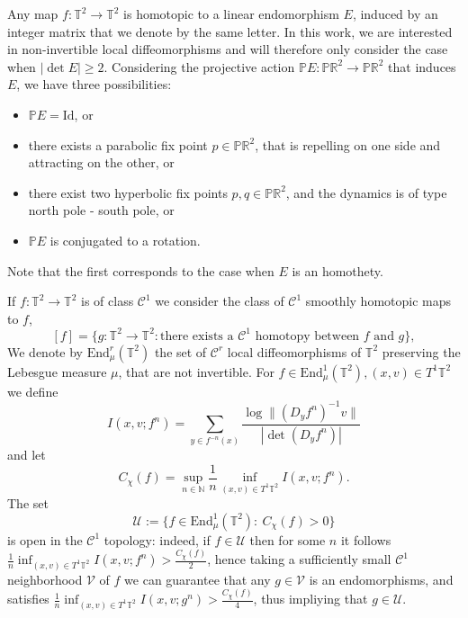 \documentclass[11pt,letterpaper,reqno]{article}
\newcommand{\Tor}{\mathbb{T}^2}
\newcommand{\Pp}{\mathbb P}
\newcommand{\TT}{\mathbb{T}^2}
\newcommand{\RR}{\mathbb{R}^2}
\begin{document}
Any map $f:\Tor\to\Tor$ is homotopic to a linear endomorphism $E$, induced by an  integer matrix that we denote by the same letter. In this work, we are interested in non-invertible local diffeomorphisms and will therefore only consider the case when $|\det E | \geq 2$. Considering the projective action $\Pp E: \Pp \RR \to \Pp \RR$ that induces $E$, we have three possibilities:
\begin{itemize}
	\item $\Pp E=\mathrm{Id}$, or
	\item there exists a parabolic fix point $p\in \Pp \RR$, that is repelling on one side and attracting on the other, or
	\item there exist two hyperbolic fix points $p,q\in \Pp \RR$, and the dynamics is of type north pole - south pole, or
	\item $\Pp E$ is conjugated to a rotation.
\end{itemize}

Note that the first corresponds to the case when $E$ is an homothety.

If $f:\Tor\to\Tor$ is of class $\mathcal C^1$ we consider the class of $\mathcal C^1$ smoothly homotopic maps to $f$,
\[
	[f]=\{g:\Tor\to\Tor: \text{there exists a }\mathcal C^1\text{ homotopy between $f$ and $g$}\},
\]
We denote by $\mathrm{End}_{\mu}^r(\TT)$ the set of $\mathcal C^r$ local diffeomorphisms of $\TT$ preserving the Lebesgue measure $\mu$, that are not invertible. For $f\in \mathrm{End}^1_{\mu}(\TT), (x,v)\in T^1\TT$ we define 
\begin{equation}\label{eq:I}
I(x,v;f^n)=\sum_{y\in f^{-n}(x)}\frac{\log\|(D_yf^n)^{-1}v\|}{|\det(D_yf^n)|}
\end{equation}
and let
\begin{equation}\label{eq:Cf}
C_{\chi}(f)=\sup_{n\in\mathbb N}\frac 1n\inf_{(x,v)\in T^1\TT}I(x,v;f^n).
\end{equation}
The set
\begin{equation}\label{eq:U}
\mathcal U:=\{f\in \mathrm{End}^1_{\mu}(\TT):\ C_{\chi}(f)>0\}
\end{equation}
is open in the $\mathcal C^1$ topology: indeed, if $f\in\mathcal U$ then for some $n$ it follows $\frac 1n\inf_{(x,v)\in T^1\TT}I(x,v;f^n)>\frac{C_{\chi}(f)}{2}$, hence taking a sufficiently small $\mathcal C^1$ neighborhood $\mathcal V$ of $f$ we can guarantee that any $g\in\mathcal V$ is an endomorphisms, and satisfies $\frac 1n\inf_{(x,v)\in T^1\TT}I(x,v;g^n)>\frac{C_{\chi}(f)}{4}$, thus impliying that $g\in \mathcal U$. 
\end{document}
